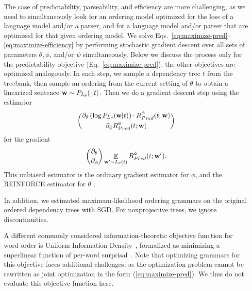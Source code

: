 \documentclass[12pt]{article}
\DeclareMathOperator{\E}{\mathop{\mathbb{E}}}
\begin{document}
The case of predictability, parseability, and efficiency are more challenging, as we need to simultaneously look for an ordering model optimized for the loss of a language model and/or a parser, and for a language model and/or parser that are optimized for that given ordering model.
We solve Eqs.~\ref{eq:maximize-pred}--\ref{eq:maximize-efficiency} by performing stochastic gradient descent over all sets of parameters $\theta, \phi$, and/or $\psi$ simultaneously.
Below we discuss the process only for the predictability objective (Eq.~\ref{eq:maximize-pred}); the other objectives are optimized analogously.
In each step, we sample a dependency tree $t$ from the treebank, then sample an ordering from the current setting of $\theta$ to obtain a linearized sentence ${\bf w} \sim P_{L_\theta}(\cdot|t)$.
Then we %
do a gradient descent step using the estimator %
\begin{equation}\label{eq:estimator}
{ \partial_\theta \left(\log P_{L_\theta}({\bf w}|t)\right) \cdot R^\phi_{Pred} (t; {\bf w}) \choose  \partial_\phi R_{Pred}^\phi(t; {\bf w})}
\end{equation}
for the gradient
$${ \partial_\theta \choose \partial_\phi} \E_{{\bf w'} \sim L_\theta(t)} R_{Pred}^\phi(t; {\bf w'}).$$
This unbiased estimator is the ordinary gradient estimator for $\phi$, and the REINFORCE estimator for $\theta$ \citep{williams1992simple}.

In addition, we estimated maximum-likelihood ordering grammars on the original ordered dependency trees with SGD. For nonprojective trees, we ignore discontinuities.

A different commonly considered information-theoretic objective function for word order is Uniform Information Density~\citep{jaeger2010redundancy}, formalized as minimizing a superlinear function of per-word surprisal~\citep{levy:2018cogsci}.
Note that optimizing grammars for this objective faces additional challenges, as the optimization problem cannot be rewritten as joint optimization in the form (\ref{eq:maximize-pred}).
We thus do not evaluate this objective function here.
\end{document}
